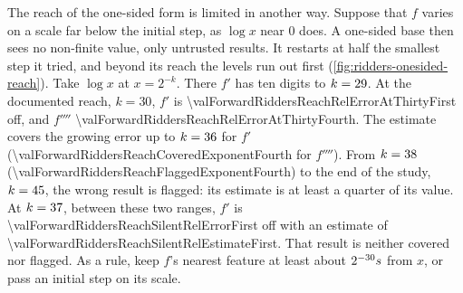 The reach of the one-sided form is limited in another way. Suppose that $f$ varies on a scale far below the initial
step, as $\log x$ near 0 does. A one-sided base then sees no non-finite value, only untrusted results. It restarts at
half the smallest step it tried, and beyond its reach the levels run out first (\cref{fig:ridders-onesided-reach}).
Take $\log x$ at $x = 2^{-k}$. There $f'$ has ten digits to $k = \num{29}$.
At the documented reach, $k = 30$, $f'$ is \num{\valForwardRiddersReachRelErrorAtThirtyFirst} off, and $f''''$
\num{\valForwardRiddersReachRelErrorAtThirtyFourth}. The estimate covers the growing error up to
$k = \num{36}$ for $f'$ (\num{\valForwardRiddersReachCoveredExponentFourth}
for $f''''$). From $k = \num{38}$
(\num{\valForwardRiddersReachFlaggedExponentFourth}) to the end of the study, $k = \num{45}$,
the wrong result is flagged: its estimate is at least a quarter of its value. At
$k = \num{37}$, between these two ranges, $f'$ is
\num{\valForwardRiddersReachSilentRelErrorFirst} off with an estimate of
\num{\valForwardRiddersReachSilentRelEstimateFirst}. That result is neither covered nor flagged. As a rule, keep
$f$'s nearest feature at least about $2^{-30} s$ from $x$, or pass an initial step on its scale.

